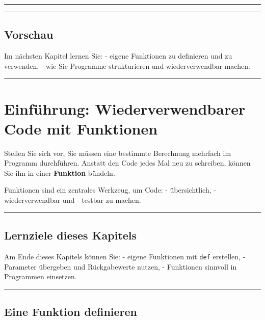 \documentclass[
  letterpaper,
  DIV=11,
  numbers=noendperiod]{scrreprt}
\begin{document}
\begin{tcolorbox}
\begin{center}\rule{0.5\linewidth}{0.5pt}\end{center}

\begin{center}\rule{0.5\linewidth}{0.5pt}\end{center}

\section{Vorschau}\label{vorschau}

Im nächsten Kapitel lernen Sie: - eigene Funktionen zu definieren und zu
verwenden, - wie Sie Programme strukturieren und wiederverwendbar
machen.

\begin{center}\rule{0.5\linewidth}{0.5pt}\end{center}

\chapter{Einführung: Wiederverwendbarer Code mit
Funktionen}\label{einfuxfchrung-wiederverwendbarer-code-mit-funktionen}

Stellen Sie sich vor, Sie müssen eine bestimmte Berechnung mehrfach im
Programm durchführen. Anstatt den Code jedes Mal neu zu schreiben,
können Sie ihn in einer \textbf{Funktion} bündeln.

Funktionen sind ein zentrales Werkzeug, um Code: - übersichtlich, -
wiederverwendbar und - testbar zu machen.

\begin{center}\rule{0.5\linewidth}{0.5pt}\end{center}

\section{Lernziele dieses Kapitels}\label{lernziele-dieses-kapitels-3}

Am Ende dieses Kapitels können Sie: - eigene Funktionen mit \texttt{def}
erstellen, - Parameter übergeben und Rückgabewerte nutzen, - Funktionen
sinnvoll in Programmen einsetzen.

\begin{center}\rule{0.5\linewidth}{0.5pt}\end{center}

\section{Eine Funktion definieren}\label{eine-funktion-definieren}


\end{tcolorbox}
\end{document}
